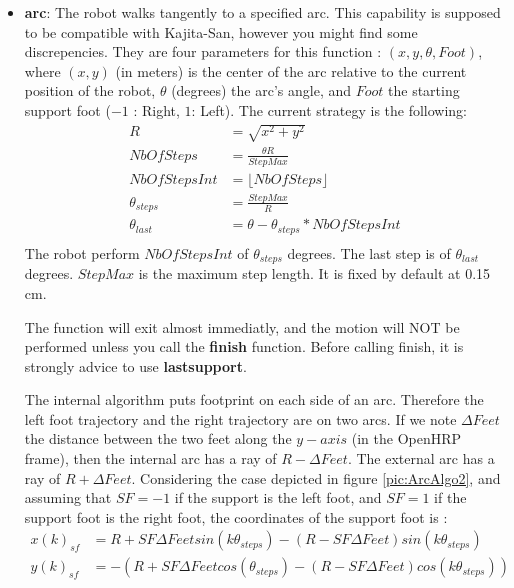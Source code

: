 \begin{itemize}
\item {\bf arc}: The robot walks tangently to a specified arc.
This capability is supposed to be compatible with Kajita-San, however you might find
some discrepencies. They are four parameters for this function : $(x,y,\theta,Foot)$,
where $(x,y)$ (in meters) is the center of the arc relative to the current position of the robot,
$\theta$ (degrees) the arc's angle, and $Foot$ the starting support foot ($-1$ : Right, $1$: Left).
The current strategy is the following:
\begin{equation}
\begin{aligned}
R &= \sqrt{x^2+y^2} \\
NbOfSteps &= \frac{\theta R }{StepMax} \\
NbOfStepsInt &= \lfloor NbOfSteps \rfloor \\
\theta_{steps} &= \frac{StepMax}{R} \\
\theta_{last} &= \theta - \theta_{steps} * NbOfStepsInt \\
\end{aligned}
\end{equation}
The robot perform $NbOfStepsInt$ of $\theta_{steps}$ degrees.
The last step is of $\theta_{last}$ degrees.
$StepMax$ is the maximum step length. It is fixed by default at 0.15 cm.
\par
The function will exit almost immediatly, and the motion will NOT
be performed unless you call the {\bf finish} function.
Before calling finish, it is strongly advice to use {\bf lastsupport}.

The internal algorithm puts footprint on each side of an arc.
Therefore the left foot trajectory and the right trajectory are on two arcs.
If we note $\Delta Feet$ the distance between the two feet along the $y-axis$
(in the OpenHRP frame), then the internal arc has a ray of $R - \Delta Feet$.
The external arc has a ray of $R + \Delta Feet$.
Considering the case depicted in figure \ref{pic:ArcAlgo2},
and assuming that $SF= -1$ if the support is the left foot,
and $SF=1$ if the support foot is the right foot, the coordinates
of the support foot is :
\begin{equation*}
\begin{aligned}
x(k)_{sf} &= R + SF  \Delta Feet  sin(k \theta_{steps}) - (R-SF \Delta Feet ) sin(k \theta_{steps}) \\
y(k)_{sf} &= -(R + SF  \Delta Feet  cos(\theta_{steps}) - (R-SF \Delta Feet ) cos(k \theta_{steps}) )\\
\end{aligned}
\end{equation*}


\end{itemize}
